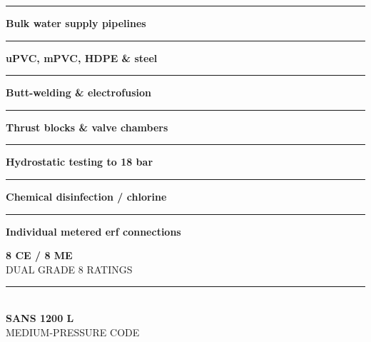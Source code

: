\begin{minipage}[t]{0.34\textwidth}
    \vspace{0pt}
    \begin{tcolorbox}[
        enhanced, colback=mhoffwhite, colframe=mhnavy, boxrule=1pt, arc=4pt,
        title={\bfseries\color{white}\faTint\ Water Scope of Work},
        colbacktitle=mhnavy, left=7pt, right=7pt, top=6pt, bottom=6pt,
        drop shadow=black!6
    ]
        \fontsize{8.1pt}{11.6pt}\selectfont
        \textcolor{mhnavy}{\rule{4pt}{4pt}}\hspace{4pt}\textbf{Bulk water supply pipelines}\\
        \textcolor{mhnavy}{\rule{4pt}{4pt}}\hspace{4pt}\textbf{uPVC, mPVC, HDPE \& steel}\\
        \textcolor{mhnavy}{\rule{4pt}{4pt}}\hspace{4pt}\textbf{Butt-welding \& electrofusion}\\
        \textcolor{mhnavy}{\rule{4pt}{4pt}}\hspace{4pt}\textbf{Thrust blocks \& valve chambers}\\
        \textcolor{mhnavy}{\rule{4pt}{4pt}}\hspace{4pt}\textbf{Hydrostatic testing to 18 bar}\\
        \textcolor{mhnavy}{\rule{4pt}{4pt}}\hspace{4pt}\textbf{Chemical disinfection / chlorine}\\
        \textcolor{mhnavy}{\rule{4pt}{4pt}}\hspace{4pt}\textbf{Individual metered erf connections}
    \end{tcolorbox}

    \vspace{0.20cm}

    \begin{tcolorbox}[
        enhanced, colback=white, colframe=mhlightgray, boxrule=0.8pt, arc=4pt,
        left=6pt, right=6pt, top=6pt, bottom=6pt, halign=center,
        drop shadow=black!4
    ]
        {\fontsize{18pt}{20pt}\selectfont\bfseries\color{mhblue}8 CE / 8 ME}\\[1pt]
        {\fontsize{7.4pt}{9pt}\selectfont\color{mhtextmuted}\MakeUppercase{Dual Grade 8 Ratings}}\\[4pt]
        \textcolor{mhlightgray}{\rule{3.2cm}{0.6pt}}\\[4pt]
        {\fontsize{13pt}{15pt}\selectfont\bfseries\color{mhnavy}SANS 1200 L}\\[1pt]
        {\fontsize{7.2pt}{9pt}\selectfont\color{mhtextmuted}\MakeUppercase{Medium-Pressure Code}}
    \end{tcolorbox}
\end{minipage}

